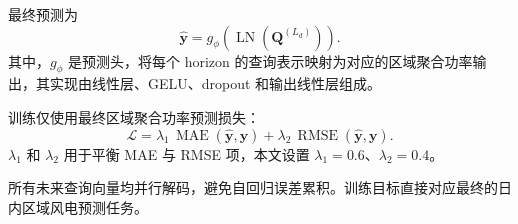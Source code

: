 最终预测为
\begin{equation}
\hat{\mathbf{y}}=g_{\phi}(\operatorname{LN}(\mathbf{Q}^{(L_d)})).
\end{equation}
其中，\(g_{\phi}\) 是预测头，将每个 horizon 的查询表示映射为对应的区域聚合功率输出，其实现由线性层、GELU、dropout 和输出线性层组成。

训练仅使用最终区域聚合功率预测损失：
\begin{equation}
\mathcal{L}=\lambda_1\,\operatorname{MAE}(\hat{\mathbf{y}},\mathbf{y})
+\lambda_2\,\operatorname{RMSE}(\hat{\mathbf{y}},\mathbf{y}).
\end{equation}
\(\lambda_1\) 和 \(\lambda_2\) 用于平衡 MAE 与 RMSE 项，本文设置 \(\lambda_1=0.6\)、\(\lambda_2=0.4\)。

所有未来查询向量均并行解码，避免自回归误差累积。训练目标直接对应最终的日内区域风电预测任务。
